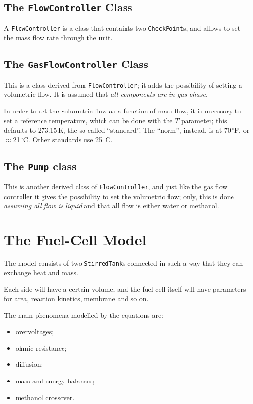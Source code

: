 \documentclass[a4paper]{article}
\newcommand{\textdegree}{\ensuremath{^{\circ}}}
\begin{document}
\subsection{The \texttt{FlowController} Class}
A \texttt{FlowController} is a class that containts two \texttt{CheckPoint}s,
and allows to set the mass flow rate through the unit.


\subsection{The \texttt{GasFlowController} Class}
This is a class derived from \texttt{FlowController}; it adds the possibility
of setting a volumetric flow. It is assumed that \emph{all components are in
gas phase}.

In order to set the volumetric flow as a function of mass flow, it is necessary
to set a reference temperature, which can be done with the $T$ parameter; this
defaults to 273.15\,K, the so-called ``standard''. The ``norm'', instead, is at
70\,\textdegree F, or $\approx$21\,\textdegree C. Other standards use
25\,\textdegree C.


\subsection{The \texttt{Pump} class}
This is another derived class of \texttt{FlowController}, and just like the gas
flow controller it gives the possibility to set the volumetric flow;
only, this is done \emph{assuming all flow is liquid} and that all flow is
either water or methanol.

\section{The Fuel-Cell Model}

The model consists of two \texttt{StirredTank}s connected in such a way that
they can exchange heat and mass.

Each side will have a certain volume, and the fuel cell itself will have
parameters for area, reaction kinetics, membrane and so on.

The main phenomena modelled by the equations are:
\begin{itemize}
\item overvoltages;
\item ohmic resistance;
\item diffusion;
\item mass and energy balances;
\item methanol crossover.
\end{itemize}
\end{document}
